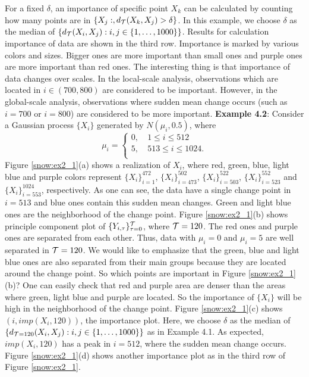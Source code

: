 \documentclass[preprint, review, 12pt]{article}
\theoremstyle{definition}
\theoremstyle{remark}
\begin{document}
For a fixed $\delta$, an importance of specific point $X_{k}$ can be calculated by counting how many points are in $\{X_j:,d_{\cal T}(X_{k},X_{j})>\delta\}$. In this example, we choose $\delta$ as the median of $\{d_{\cal T}(X_{i},X_{j}): i,j \in \{1,\dots,1000\} \}$. Results for calculation importance of data are shown in the third row. Importance is marked by various colors and sizes. Bigger ones are more important than small ones and purple ones are more important than red ones. The interesting thing is that importance of data changes over scales. In the local-scale analysis, observations which are located in $i \in (700,800)$ are considered to be important. However, in the global-scale analysis, observations where sudden mean change occurs (such as $i=700$ or $i=800$) are considered to be more important. 
\vskip 3mm
\noindent\textbf{Example 4.2}:
Consider a Gaussian process $\{X_i\}$ generated by $N(\mu_i,0.5)$, where 
$${\mu_i=\left\{
	\begin{array}{ll}
	0, &~1\le i \le 512\\
	5, &~513\le i \le 1024.\\
	\end{array}
	\right.}$$
Figure \ref{snow:ex2_1}(a) shows a realization of $X_i$, where red, green, blue, light blue and purple colors represent $\{X_i\}_{i=1}^{472}$,  $\{X_i\}_{i=473}^{502}$, $\{X_i\}_{i=503}^{522}$, $\{X_i\}_{i=523}^{552}$ and $\{X_i\}_{i=553}^{1024}$, respectively. As one  can see, the data have a single change point in $i=513$ and blue ones contain this sudden mean changes. Green and light blue ones are the neighborhood of the change point. Figure \ref{snow:ex2_1}(b) shows principle component plot of $\{Y_{i,\tau}\}_{\tau=0}^{\cal T}$, where ${\cal T}=120$. The red ones and purple ones are separated from each other. Thus, data with $\mu_i=0$ and $\mu_i=5$ are well separated in ${\cal T}=120$. We would like to emphasize that the green, blue and light blue ones are also separated from their main groups because they are located around the change point. So which points are important in Figure \ref{snow:ex2_1}(b)? One can easily check that red and purple area are denser than the areas where green, light blue and purple are located. So the importance of $\{X_i\}$ will be high in the neighborhood of the change point. Figure \ref{snow:ex2_1}(c) shows $(i,imp(X_i,120)) $, the importance plot. Here, we choose $\delta$ as the median of $\{d_{{\cal T}=120}(X_{i},X_{j}): i,j \in \{1,\dots,1000\} \}$ as in Example 4.1. As expected, $imp(X_i,120)$ has a peak in $i=512$, where the sudden mean change occurs. Figure \ref{snow:ex2_1}(d) shows another importance plot as in the third row of Figure \ref{snow:ex2_1}. 
\end{document}
